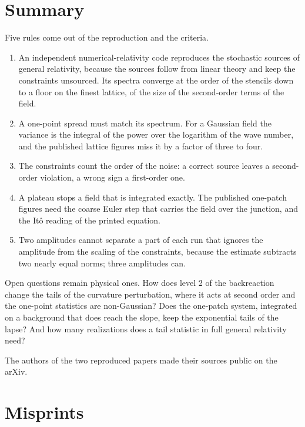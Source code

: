 \documentclass[aps,prd,twocolumn,10pt,superscriptaddress,nofootinbib,longbibliography,floatfix]{revtex4-2}
\begin{document}
\section{Summary}\label{sec:summary}

Five rules come out of the reproduction and the criteria.
\begin{enumerate}
\item An independent numerical-relativity code reproduces the stochastic sources of general relativity, because the sources follow from linear theory and keep the constraints unsourced. Its spectra converge at the order of the stencils down to a floor on the finest lattice, of the size of the second-order terms of the field.
\item A one-point spread must match its spectrum. For a Gaussian field the variance is the integral of the power over the logarithm of the wave number, and the published lattice figures miss it by a factor of three to four.
\item The constraints count the order of the noise: a correct source leaves a second-order violation, a wrong sign a first-order one.
\item A plateau stops a field that is integrated exactly. The published one-patch figures need the coarse Euler step that carries the field over the junction, and the It\^o reading of the printed equation.
\item Two amplitudes cannot separate a part of each run that ignores the amplitude from the scaling of the constraints, because the estimate subtracts two nearly equal norms; three amplitudes can.
\end{enumerate}

Open questions remain physical ones. How does level 2 of the backreaction change the tails of the curvature perturbation, where it acts at second order and the one-point statistics are non-Gaussian? Does the one-patch system, integrated on a background that does reach the slope, keep the exponential tails of the lapse? And how many realizations does a tail statistic in full general relativity need?

\begin{acknowledgments}
The authors of the two reproduced papers made their sources public on the arXiv.
\end{acknowledgments}

\appendix

\section{Misprints}\label{app:errata}
\end{document}
